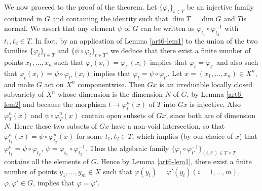 We now proceed to the proof of the theorem. Let $\{\varphi_t\}_{t \in T}$ be an injective family contained in $G$ and containing the identity such that $\dim T = \dim G$ and $T$\pageoriginale is normal. We assert that any element $\psi$ of $G$ can be written as $\varphi_{t_1} \circ \varphi^{-1}_{t_2}$ with $t_1, t_2 \in T$. In fact, by an application of Lemma \ref{art6-lem1} to the union of the two families $\{\varphi_t\}_{t \in T}$ and $\{\psi \circ \varphi_t\}_{t \in T}$, we deduce that there exist a finite number of points $x_1, \ldots, x_n$ such that $\varphi_t (x_i) = \varphi_{t'} (x_i)$ implies that $\varphi_t = \varphi_{t'}$ and also such that $\varphi_t(x_i) = \psi \circ \varphi_{t'} (x_i)$ implies that $\varphi_t = \psi \circ \varphi_{t'}$. Let $x = (x_1, \ldots, x_n) \in X^n$, and make $G$ act on $X^n$ componentwise. Then $Gx$ is an irreducible locally closed subvariety of $X^n$ whose dimension is the dimension $N$ of $G$, by Lemma \ref{art6-lem2} and because the morphism $t \to \varphi^n_t (x)$ of $T$ into $Gx$ is injective. Also $\varphi^n_T (x)$ and $\psi \circ \varphi^n_T (x)$ contain open subsets of $Gx$, since both are of dimension $N$. Hence these two subsets of $Gx$ have a non-void intersection, so that $\varphi^n_{t_1} (x) = \psi \circ \varphi^n_{t_2} (x)$ for some $t_1, t_2 \in T$, which implies (by our choice of $x$) that $\varphi^n_{t_1} = \psi \circ \varphi_{t_2}$, $\psi = \varphi_{t_1} \circ \varphi^{-1}_{t_2}$. Thus the algebraic family $\{\varphi_t \circ \varphi^{-1}_{t'}\}_{(t, t') \in T \times T}$ contains all the elements of $G$. Hence by Lemma \ref{art6-lem1}, there exist a finite number of points $y_1, \ldots, y_m \in X$ such that $\varphi (y_i) = \varphi' (y_i) (i = 1, \ldots, m)$, $\varphi, \varphi' \in G$, implies that $\varphi = \varphi'$.


